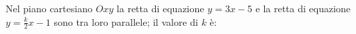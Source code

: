 Nel piano cartesiano \( \displaystyle {Oxy}\) la retta di equazione 
\( \displaystyle y=3x-5\) e la retta di equazione \( \displaystyle y=\frac k 2x-1\)
sono tra loro parallele; il valore di \( \displaystyle k\) è: